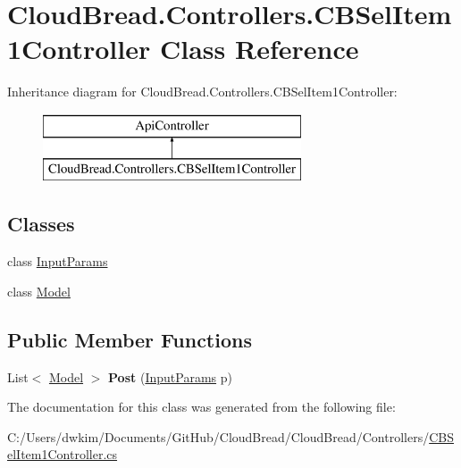 \hypertarget{class_cloud_bread_1_1_controllers_1_1_c_b_sel_item1_controller}{}\section{Cloud\+Bread.\+Controllers.\+C\+B\+Sel\+Item1\+Controller Class Reference}
\label{class_cloud_bread_1_1_controllers_1_1_c_b_sel_item1_controller}
Inheritance diagram for Cloud\+Bread.\+Controllers.\+C\+B\+Sel\+Item1\+Controller\+:\begin{figure}[H]
\begin{center}
\leavevmode
\includegraphics[height=2.000000cm]{class_cloud_bread_1_1_controllers_1_1_c_b_sel_item1_controller}
\end{center}
\end{figure}
\subsection*{Classes}
\begin{DoxyCompactItemize}
\item 
class \hyperlink{class_cloud_bread_1_1_controllers_1_1_c_b_sel_item1_controller_1_1_input_params}{Input\+Params}
\item 
class \hyperlink{class_cloud_bread_1_1_controllers_1_1_c_b_sel_item1_controller_1_1_model}{Model}
\end{DoxyCompactItemize}
\subsection*{Public Member Functions}
\begin{DoxyCompactItemize}
\item 
List$<$ \hyperlink{class_cloud_bread_1_1_controllers_1_1_c_b_sel_item1_controller_1_1_model}{Model} $>$ {\bfseries Post} (\hyperlink{class_cloud_bread_1_1_controllers_1_1_c_b_sel_item1_controller_1_1_input_params}{Input\+Params} p)\hypertarget{class_cloud_bread_1_1_controllers_1_1_c_b_sel_item1_controller_a4feb86ced862652ce4b266decb2ae692}{}\label{class_cloud_bread_1_1_controllers_1_1_c_b_sel_item1_controller_a4feb86ced862652ce4b266decb2ae692}

\end{DoxyCompactItemize}


The documentation for this class was generated from the following file\+:\begin{DoxyCompactItemize}
\item 
C\+:/\+Users/dwkim/\+Documents/\+Git\+Hub/\+Cloud\+Bread/\+Cloud\+Bread/\+Controllers/\hyperlink{_c_b_sel_item1_controller_8cs}{C\+B\+Sel\+Item1\+Controller.\+cs}\end{DoxyCompactItemize}
